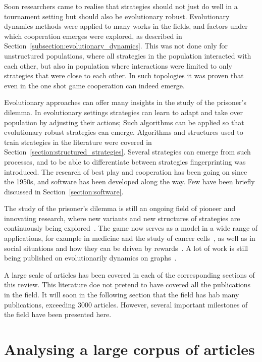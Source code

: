 \documentclass{article}
\theoremstyle{definition}
\begin{document}
Soon researchers came to realise that strategies should not just do well in a tournament setting
but should also be evolutionary robust. Evolutionary dynamics methods were
applied to many works in the fields, and factors under which cooperation
emerges were explored, as described in Section~\ref{subsection:evolutionary_dynamics}.
This was not done only for unstructured populations, where all strategies
in the population interacted with each other, but also in population where
interactions were limited to only strategies that were close to each other.
In such topologies it was proven that even in the one shot game cooperation can
indeed emerge.

Evolutionary approaches can offer many insights in the study of the prisoner's
dilemma. In evolutionary settings strategies can learn to adapt and take over
population by adjusting their actions;
Such algorithms can be applied so that evolutionary robust strategies can emerge.
Algorithms and structures used to train strategies in the literature were covered in
Section~\ref{section:structured_strategies}. Several strategies can emerge from
such processes, and to be able to differentiate between strategies fingerprinting
was introduced. The research of best play and cooperation has been going on
since the 1950s, and software has been developed along the way.
Few have been briefly discussed in Section~\ref{section:software}.

The study of the prisoner's dilemma is still an ongoing field of pioneer and
innovating research, where new variants and new structures of strategies are
continuously being explored~\cite{Ohtsuki2018}. The game now serves as a model
in a wide range of applications, for example in medicine and the study of cancer
cells~\cite{archetti2018, Kaznatchee2017}, as well as in social situations and
how they can be driven by rewards~\cite{Dridi2018}. A lot of work is still being
published on  evolutionarily dynamics on graphs~\cite{Allen2017, hathcock2018,
Liu2017}.

A large scale of articles has been covered in each of the corresponding sections
of this review. This literature doe not pretend to have covered all the publications
in the field. It will soon in the following section that the field has hab many
publications, exceeding 3000 articles. However, several important milestones
of the field have been presented here.

\section{Analysing a large corpus of articles}\label{section:analysis}
\end{document}
